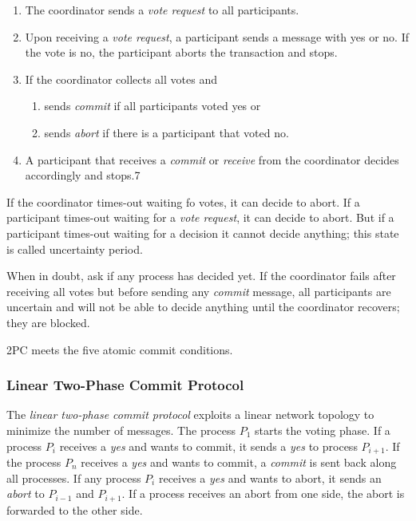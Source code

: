 \begin{enumerate}
\item The coordinator sends a \textit{vote request} to all participants.
\item Upon receiving a \textit{vote request}, a participant sends a message with yes or no. If the vote is no, the participant aborts the transaction and stops.
\item If the coordinator collects all votes and
	\begin{enumerate}
	\item sends \textit{commit} if all participants voted yes or
	\item sends \textit{abort} if there is a participant that voted no.
	\end{enumerate}
\item A participant that receives a \textit{commit} or \textit{receive} from the coordinator decides accordingly and stops.7
\end{enumerate}

If the coordinator times-out waiting fo votes, it can decide to abort. If a participant times-out waiting for a \textit{vote request}, it can decide to abort. But if a participant times-out waiting for a decision it cannot decide anything; this state is called uncertainty period.

When in doubt, ask if any process has decided yet. If the coordinator fails after receiving all votes but before sending any \textit{commit} message, all participants are uncertain and will not be able to decide anything until the coordinator recovers; they are blocked.

\begin{note}
2PC meets the five atomic commit conditions.
\end{note}




\subsubsection{Linear Two-Phase Commit Protocol}

The \emph{linear two-phase commit protocol} exploits a linear network topology to minimize the number of messages. The process $P_1$ starts the voting phase. If a process $P_i$ receives a \textit{yes} and wants to commit, it sends a \textit{yes} to process $P_{i+1}$. If the process $P_n$ receives a \textit{yes} and wants to commit, a \textit{commit} is sent back along all processes. If any process $P_i$ receives a \textit{yes} and wants to abort, it sends an \textit{abort} to $P_{i-1}$ and $P_{i+1}$. If a process receives an abort from one side, the abort is forwarded to the other side.

